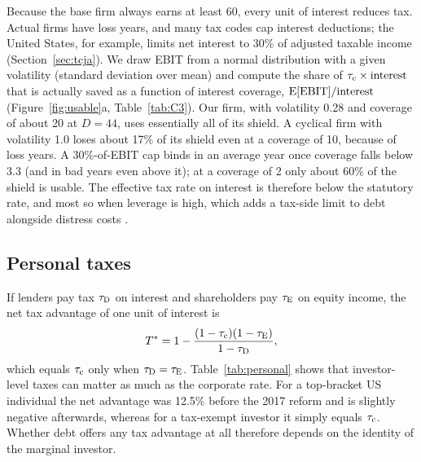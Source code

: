 Because the base firm always earns at least 60, every unit of interest reduces tax. Actual firms have loss years, and many tax codes cap interest deductions; the United States, for example, limits net interest to 30\% of adjusted taxable income (Section~\ref{sec:tcja}). We draw EBIT from a normal distribution with a given volatility (standard deviation over mean) and compute the share of $\tau_{\mathrm{c}} \times \text{interest}$ that is actually saved as a function of interest coverage, $\mathrm{E}[\text{EBIT}]/\text{interest}$ (Figure~\ref{fig:usable}a, Table~\ref{tab:C3}). Our firm, with volatility 0.28 and coverage of about 20 at $D = 44$, uses essentially all of its shield. A cyclical firm with volatility 1.0 loses about 17\% of its shield even at a coverage of 10, because of loss years. A 30\%-of-EBIT cap binds in an average year once coverage falls below 3.3 (and in bad years even above it); at a coverage of 2 only about 60\% of the shield is usable. The effective tax rate on interest is therefore below the statutory rate, and most so when leverage is high, which adds a tax-side limit to debt alongside distress costs \citep{deangelo1980}.

\subsection{Personal taxes}\label{sec:personal}

If lenders pay tax $\tau_{\mathrm{D}}$ on interest and shareholders pay $\tau_{\mathrm{E}}$ on equity income, the net tax advantage of one unit of interest is \citep{miller1977}
\begin{equation}
  T^{*} = 1 - \frac{(1 - \tau_{\mathrm{c}})(1 - \tau_{\mathrm{E}})}{1 - \tau_{\mathrm{D}}},
  \label{eq:miller}
\end{equation}
which equals $\tau_{\mathrm{c}}$ only when $\tau_{\mathrm{D}} = \tau_{\mathrm{E}}$. Table~\ref{tab:personal} shows that investor-level taxes can matter as much as the corporate rate. For a top-bracket US individual the net advantage was 12.5\% before the 2017 reform and is slightly negative afterwards, whereas for a tax-exempt investor it simply equals $\tau_{\mathrm{c}}$. Whether debt offers any tax advantage at all therefore depends on the identity of the marginal investor.

